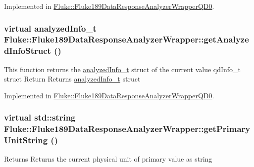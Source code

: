 Implemented in \hyperlink{classFluke_1_1Fluke189DataResponseAnalyzerWrapperQD0_a3f1bdb92d10f341c8b22fa8ee95600b5}{Fluke::Fluke189DataResponseAnalyzerWrapperQD0}.\hypertarget{classFluke_1_1Fluke189DataResponseAnalyzerWrapper_a006925b794ce1cd11ca13668fbcf5b64}{
\subsubsection[{getAnalyzedInfoStruct}]{\setlength{\rightskip}{0pt plus 5cm}virtual {\bf analyzedInfo\_\-t} Fluke::Fluke189DataResponseAnalyzerWrapper::getAnalyzedInfoStruct ()}}
\label{classFluke_1_1Fluke189DataResponseAnalyzerWrapper_a006925b794ce1cd11ca13668fbcf5b64}
This function returns the \hyperlink{structFluke_1_1Fluke189DataResponseAnalyzerWrapper_1_1analyzedInfo__t}{analyzedInfo\_\-t} struct of the current value qdInfo\_\-t struct Return Returns \hyperlink{structFluke_1_1Fluke189DataResponseAnalyzerWrapper_1_1analyzedInfo__t}{analyzedInfo\_\-t} struct 

Implemented in \hyperlink{classFluke_1_1Fluke189DataResponseAnalyzerWrapperQD0_af6e15c77a255dbebaaeb61e6848e8b42}{Fluke::Fluke189DataResponseAnalyzerWrapperQD0}.\hypertarget{classFluke_1_1Fluke189DataResponseAnalyzerWrapper_a54f606e7d645b34c075074d72b291ce8}{
\subsubsection[{getPrimaryUnitString}]{\setlength{\rightskip}{0pt plus 5cm}virtual std::string Fluke::Fluke189DataResponseAnalyzerWrapper::getPrimaryUnitString ()}}
\label{classFluke_1_1Fluke189DataResponseAnalyzerWrapper_a54f606e7d645b34c075074d72b291ce8}
\begin{DoxyReturn}{Returns}
Returns the current physical unit of primary value as string 
\end{DoxyReturn}


